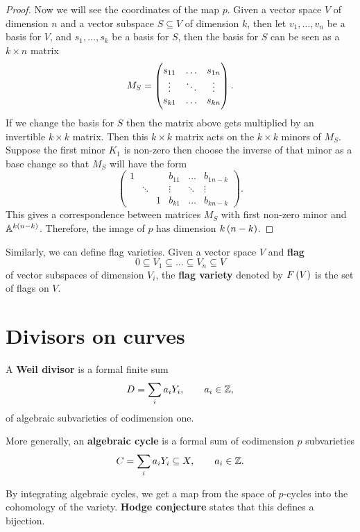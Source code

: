\begin{proof}
Now we will see the coordinates of the map $ p $. Given a vector space $ V $ of dimension $ n $ and a vector subspace $ S \subseteq V $ of dimension $ k $, then let $ v_1, \dots, v_n $ be a basis for $ V $, and $ s_1, \dots, s_k $ be a basis for $ S $, then the basis for $ S $ can be seen as a $ k \times n $ matrix
$$ M_S = \threebythree{s_{11}}{\dots}{s_{1n}}{\vdots}{\ddots}{\vdots}{s_{k1}}{\dots}{s_{kn}}. $$
If we change the basis for $ S $ then the matrix above gets multiplied by an invertible $ k \times k $ matrix. Then this $ k \times k $ matrix acts on the $ k \times k $ minors of $ M_S $. Suppose the first minor $ K_1 $ is non-zero then choose the inverse of that minor as a base change so that $ M_S $ will have the form
$$
\begin{pmatrix}
1 & & & b_{11} & \dots & b_{1n - k} \\
& \ddots & & \vdots & \ddots & \vdots \\
& & 1 & b_{k1} & \dots & b_{kn - k}
\end{pmatrix}.
$$
This gives a correspondence between matrices $ M_S $ with first non-zero minor and $ \AA^{k\br{n - k}} $. Therefore, the image of $ p $ has dimension $ k\br{n - k} $.
\end{proof}

Similarly, we can define flag varieties. Given a vector space $ V $ and \textbf{flag}
$$ 0 \subseteq V_1 \subseteq \dots \subseteq V_n \subseteq V $$
of vector subspaces of dimension $ V_i $, the \textbf{flag variety} denoted by $ F\br{V} $ is the set of flags on $ V $.

\pagebreak

\section{Divisors on curves}

\begin{definition}
A \textbf{Weil divisor} is a formal finite sum
$$ D = \sum_i a_iY_i, \qquad a_i \in \mathbb{Z}, $$
of algebraic subvarieties of codimension one.
\end{definition}

\begin{definition}
More generally, an \textbf{algebraic cycle} is a formal sum of codimension $ p $ subvarieties
$$ C = \sum_i a_iY_i \subseteq X, \qquad a_i \in \mathbb{Z}. $$
\end{definition}

By integrating algebraic cycles, we get a map from the space of $ p $-cycles into the cohomology of the variety. \textbf{Hodge conjecture} states that this defines a bijection.

